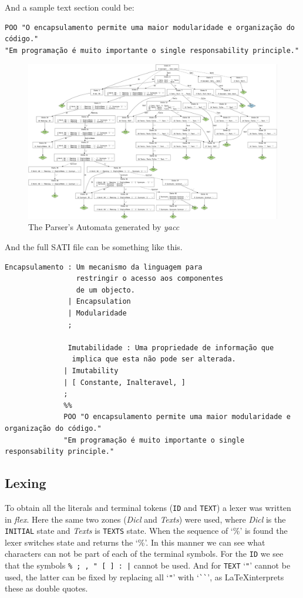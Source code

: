 \documentclass[a4paper]{report}
\begin{document}
And a sample text section could be:

\begin{verbatim}
POO "O encapsulamento permite uma maior modularidade e organização do código."
"Em programação é muito importante o single responsability principle."
\end{verbatim}

\begin{figure}[H]
    \includegraphics[width=\textwidth]{./sati.jpg}
    \caption{The Parser's Automata generated by \textit{yacc}}
\end{figure}

And the full SATI file can be something like this.

\begin{verbatim}
Encapsulamento : Um mecanismo da linguagem para
                 restringir o acesso aos componentes
                 de um objecto.
               | Encapsulation
               | Modularidade
               ;

               Imutabilidade : Uma propriedade de informação que
                implica que esta não pode ser alterada.
              | Imutability
              | [ Constante, Inalteravel, ]
              ;
              %%
              POO "O encapsulamento permite uma maior modularidade e organização do código."
              "Em programação é muito importante o single responsability principle."
\end{verbatim}

\subsection{Lexing}

To obtain all the literals and terminal tokens (\texttt{ID} and \texttt{TEXT})
a lexer was written in \textit{flex}. Here the same two zones (\textit{Dicl}
and \textit{Texts}) were used, where \textit{Dicl} is the \texttt{INITIAL}
state and \textit{Texts} is \texttt{TEXTS} state. When the sequence of `\%' is
found the lexer switches state and returns the `\%'. In this manner we can see
what characters can not be part of each of the terminal symbols. For the
\texttt{ID} we see that the symbols \verb!% ; , " [ ] : |! cannot be used. And
for \texttt{TEXT} `\verb!"!' cannot be used, the latter can be fixed by
replacing all `\verb!"!' with `\verb!``!', as \LaTeX interprets these as double
quotes.
\end{document}
